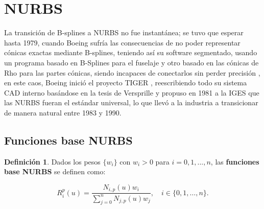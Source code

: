 \documentclass[11pt]{book}
\theoremstyle{plain} %
\theoremstyle{definition} %
\newtheorem*{defin}{Definición} %
\theoremstyle{definition} %
\begin{document}
\section{NURBS}
La transición de B-splines a NURBS no fue instantánea; se tuvo que esperar hasta 1979, cuando Boeing sufría las consecuencias de no poder representar cónicas exactas mediante B-splines, teniendo así su software
segmentado, usando un programa basado en B-Splines para el fuselaje y otro basado en las cónicas de Rho para las partes cónicas, siendo incapaces de conectarlos sin perder precisión \cite{brechner_developing_2024, farin_history_2002},
en este caos, Boeing inició el proyecto TIGER \cite{brechner_developing_2024}, reescribiendo todo su sistema CAD interno basándose en la tesis de Versprille \cite{versprille_computer_1975} y propuso en 1981 a la IGES que las NURBS fueran el estándar universal, lo que llevó a la industria a transicionar de manera natural entre 1983 y 1990.

\vspace{-0.2cm}

\subsection{Funciones base NURBS}

\vspace{-0.1cm}

\begin{defin}
    Dados los pesos $\{w_i\}$ con $w_i>0$ para $i=0,1,..., n$, las \textbf{funciones base NURBS} se definen como:

    \vspace{-0.55cm}

    \begin{equation}
        \label{eq:NURBS_Curve_Basis}
        R_i^p(u)=\frac{N_{i,p}(u) w_i}{\sum_{j=0}^{n} N_{j,p}(u) w_j},\quad i \in \{0,1, \dots , n\}.
    \end{equation}

    \vspace{-0.15cm}
\end{defin}


\end{document}
